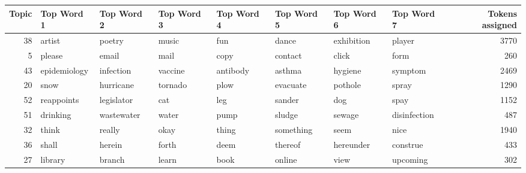 \begin{table}[ht]
\centering
\begingroup\scriptsize
\begin{tabular}{rlllllllr}
  \hline
Topic & Top Word 1 & Top Word 2 & Top Word 3 & Top Word 4 & Top Word 5 & Top Word 6 & Top Word 7 & Tokens assigned \\ 
  \hline
 38 & \cellcolor{red!40}artist & \cellcolor{red!40}poetry & \cellcolor{red!40}music & \cellcolor{red!40}fun & \cellcolor{red!40}dance & \cellcolor{red!40}exhibition & \cellcolor{red!40}player & 3770 \\ 
    5 & \cellcolor{red!30}please & \cellcolor{red!30}email & \cellcolor{red!30}mail & \cellcolor{red!30}copy & \cellcolor{red!30}contact & \cellcolor{red!30}click & \cellcolor{red!30}form & 260 \\ 
   43 & \cellcolor{red!20}epidemiology & \cellcolor{red!20}infection & \cellcolor{red!20}vaccine & \cellcolor{red!20}antibody & \cellcolor{red!20}asthma & \cellcolor{red!20}hygiene & \cellcolor{red!20}symptom & 2469 \\ 
   20 & \cellcolor{red!20}snow & \cellcolor{red!20}hurricane & \cellcolor{red!20}tornado & \cellcolor{red!20}plow & \cellcolor{red!20}evacuate & \cellcolor{red!20}pothole & \cellcolor{red!20}spray & 1290 \\ 
   52 & \cellcolor{red!20}reappoints & \cellcolor{red!20}legislator & \cellcolor{red!20}cat & \cellcolor{red!20}leg & \cellcolor{red!20}sander & \cellcolor{red!20}dog & \cellcolor{red!20}spay & 1152 \\ 
   51 & \cellcolor{red!20}drinking & \cellcolor{red!20}wastewater & \cellcolor{red!20}water & \cellcolor{red!20}pump & \cellcolor{red!20}sludge & \cellcolor{red!20}sewage & \cellcolor{red!20}disinfection & 487 \\ 
   32 & \cellcolor{red!20}think & \cellcolor{red!20}really & \cellcolor{red!20}okay & \cellcolor{red!20}thing & \cellcolor{red!20}something & \cellcolor{red!20}seem & \cellcolor{red!20}nice & 1940 \\ 
   36 & \cellcolor{red!10}shall & \cellcolor{red!10}herein & \cellcolor{red!10}forth & \cellcolor{red!10}deem & \cellcolor{red!10}thereof & \cellcolor{red!10}hereunder & \cellcolor{red!10}construe & 433 \\ 
   27 & \cellcolor{red!10}library & \cellcolor{red!10}branch & \cellcolor{red!10}learn & \cellcolor{red!10}book & \cellcolor{red!10}online & \cellcolor{red!10}view & \cellcolor{red!10}upcoming & 302 \\ 

\end{tabular}
\end{table}
